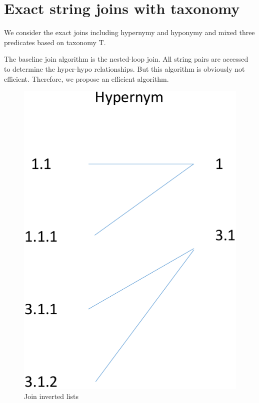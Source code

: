 \section{Exact string joins with taxonomy}

We consider the exact joins including hypernymy and hyponymy and mixed three predicates based on taxonomy T.

The baseline join algorithm is the nested-loop join. All string pairs are accessed to determine the hyper-hypo relationships. But this algorithm is obviously not efficient. Therefore, we propose an efficient algorithm.



\begin{figure}[t]
\centering
\includegraphics[scale=0.4]{figures/labeljoins}
 \caption{Join inverted lists}
\label{fig:taxonomy}
\end{figure}


